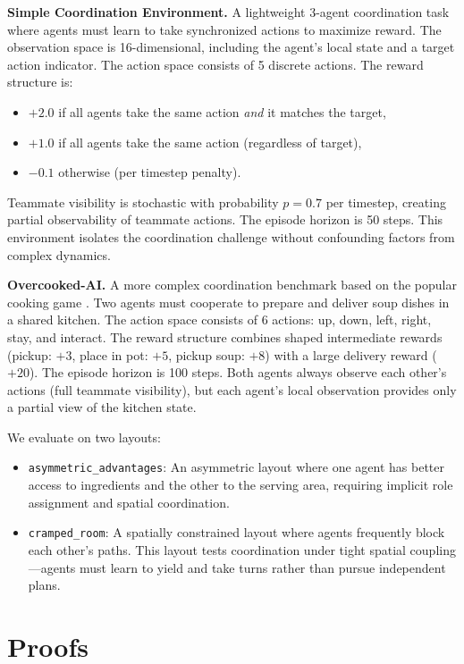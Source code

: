 \documentclass{article}
\theoremstyle{plain}
\theoremstyle{definition}
\theoremstyle{remark}
\begin{document}
\textbf{Simple Coordination Environment.} A lightweight 3-agent coordination task where agents must learn to take synchronized actions to maximize reward. The observation space is 16-dimensional, including the agent's local state and a target action indicator. The action space consists of 5 discrete actions. The reward structure is:
\begin{itemize}
\item $+2.0$ if all agents take the same action \emph{and} it matches the target,
\item $+1.0$ if all agents take the same action (regardless of target),
\item $-0.1$ otherwise (per timestep penalty).
\end{itemize}
Teammate visibility is stochastic with probability $p=0.7$ per timestep, creating partial observability of teammate actions. The episode horizon is 50 steps. This environment isolates the coordination challenge without confounding factors from complex dynamics.

\textbf{Overcooked-AI.} A more complex coordination benchmark based on the popular cooking game \cite{carroll2019utility}. Two agents must cooperate to prepare and deliver soup dishes in a shared kitchen. The action space consists of 6 actions: up, down, left, right, stay, and interact. The reward structure combines shaped intermediate rewards (pickup: $+3$, place in pot: $+5$, pickup soup: $+8$) with a large delivery reward ($+20$). The episode horizon is 100 steps. Both agents always observe each other's actions (full teammate visibility), but each agent's local observation provides only a partial view of the kitchen state.

We evaluate on two layouts:
\begin{itemize}
\item \texttt{asymmetric\_advantages}: An asymmetric layout where one agent has better access to ingredients and the other to the serving area, requiring implicit role assignment and spatial coordination.
\item \texttt{cramped\_room}: A spatially constrained layout where agents frequently block each other's paths. This layout tests coordination under tight spatial coupling---agents must learn to yield and take turns rather than pursue independent plans.
\end{itemize}

\section{Proofs}
\end{document}
